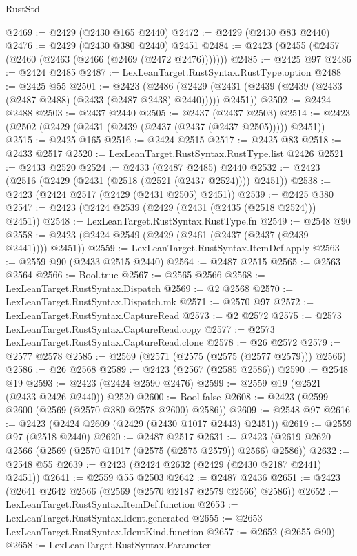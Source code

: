 \begin{lexlean}{RustStd}
\begin{coremodule}
{\begin{coremodule}
{{{{{{{{{{{{{{{{{{{{{{{{{{{{{{{{{{{{{{{@2469 := @2429 (@2430 @165 @2440)
@2472 := @2429 (@2430 @83 @2440)
@2476 := @2429 (@2430 @380 @2440) @2451
@2484 := @2423 (@2455 (@2457 (@2460 (@2463 (@2466 (@2469 (@2472 @2476)))))))
@2485 := @2425 @97
@2486 := @2424 @2485
@2487 := LexLeanTarget.RustSyntax.RustType.option
@2488 := @2425 @55
@2501 := @2423
    (@2486 (@2429 (@2431 (@2439 (@2439 (@2433 (@2487 @2488) (@2433 (@2487 @2438) @2440))))) @2451))
@2502 := @2424 @2488
@2503 := @2437 @2440
@2505 := @2437 (@2437 @2503)
@2514 := @2423 (@2502 (@2429 (@2431 (@2439 (@2437 (@2437 (@2437 @2505))))) @2451))
@2515 := @2425 @165
@2516 := @2424 @2515
@2517 := @2425 @83
@2518 := @2433 @2517
@2520 := LexLeanTarget.RustSyntax.RustType.list @2426
@2521 := @2433 @2520
@2524 := @2433 (@2487 @2485) @2440
@2532 := @2423 (@2516 (@2429 (@2431 (@2518 (@2521 (@2437 @2524)))) @2451))
@2538 := @2423 (@2424 @2517 (@2429 (@2431 @2505) @2451))
@2539 := @2425 @380
@2547 := @2423 (@2424 @2539 (@2429 (@2431 (@2435 (@2518 @2524))) @2451))
@2548 := LexLeanTarget.RustSyntax.RustType.fn
@2549 := @2548 @90
@2558 := @2423 (@2424 @2549 (@2429 (@2461 (@2437 (@2437 (@2439 @2441)))) @2451))
@2559 := LexLeanTarget.RustSyntax.ItemDef.apply
@2563 := @2559 @90 (@2433 @2515 @2440)
@2564 := @2487 @2515
@2565 := @2563 @2564
@2566 := Bool.true
@2567 := @2565 @2566
@2568 := LexLeanTarget.RustSyntax.Dispatch
@2569 := @2 @2568
@2570 := LexLeanTarget.RustSyntax.Dispatch.mk
@2571 := @2570 @97
@2572 := LexLeanTarget.RustSyntax.CaptureRead
@2573 := @2 @2572
@2575 := @2573 LexLeanTarget.RustSyntax.CaptureRead.copy
@2577 := @2573 LexLeanTarget.RustSyntax.CaptureRead.clone
@2578 := @26 @2572
@2579 := @2577 @2578
@2585 := @2569 (@2571 (@2575 (@2575 (@2577 @2579))) @2566)
@2586 := @26 @2568
@2589 := @2423 (@2567 (@2585 @2586))
@2590 := @2548 @19
@2593 := @2423 (@2424 @2590 @2476)
@2599 := @2559 @19 (@2521 (@2433 @2426 @2440)) @2520
@2600 := Bool.false
@2608 := @2423 (@2599 @2600 (@2569 (@2570 @380 @2578 @2600) @2586))
@2609 := @2548 @97
@2616 := @2423 (@2424 @2609 (@2429 (@2430 @1017 @2443) @2451))
@2619 := @2559 @97 (@2518 @2440)
@2620 := @2487 @2517
@2631 := @2423 (@2619 @2620 @2566 (@2569 (@2570 @1017 (@2575 (@2575 @2579)) @2566) @2586))
@2632 := @2548 @55
@2639 := @2423 (@2424 @2632 (@2429 (@2430 @2187 @2441) @2451))
@2641 := @2559 @55 @2503
@2642 := @2487 @2436
@2651 := @2423 (@2641 @2642 @2566 (@2569 (@2570 @2187 @2579 @2566) @2586))
@2652 := LexLeanTarget.RustSyntax.ItemDef.function
@2653 := LexLeanTarget.RustSyntax.Ident.generated
@2655 := @2653 LexLeanTarget.RustSyntax.IdentKind.function
@2657 := @2652 (@2655 @90)
@2658 := LexLeanTarget.RustSyntax.Parameter
}}}}}}}}}}}}}}}}}}}}}}}}}}}}}}}}}}}}}}}
\end{coremodule}}
\end{coremodule}
\end{lexlean}
